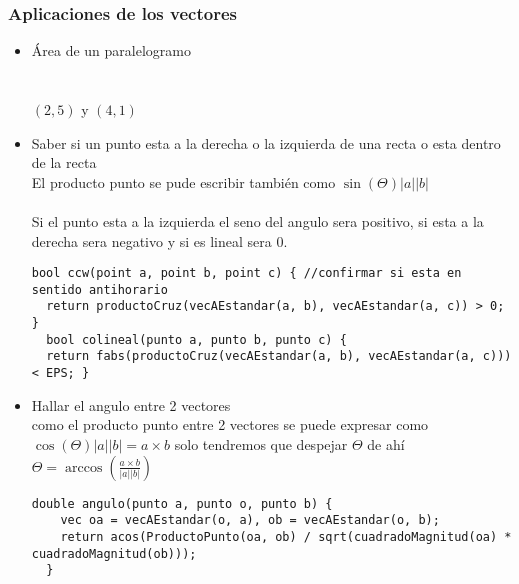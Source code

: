 \subsubsection{Aplicaciones de los vectores}
\begin{itemize}
  \item Área de un paralelogramo
  \\
  \\
  \\
  $\left ( 2,5 \right )$ y $\left (4,1 \right )$
  \item Saber si un punto esta a la derecha o la izquierda  de una recta o esta dentro de la recta
  \\El producto punto se pude escribir también como $\sin \left ( \Theta  \right )\left | a \right |\left | b \right |$
  \\
  \\
  Si el punto esta a la izquierda el seno del angulo sera positivo, si esta a la derecha sera negativo y si es lineal sera 0.
  \begin{lstlisting}[style=C]
  bool ccw(point a, point b, point c) { //confirmar si esta en sentido antihorario
  return productoCruz(vecAEstandar(a, b), vecAEstandar(a, c)) > 0; }
  bool colineal(punto a, punto b, punto c) {
  return fabs(productoCruz(vecAEstandar(a, b), vecAEstandar(a, c))) < EPS; }
  \end{lstlisting}
  \item Hallar el angulo entre 2 vectores
  \\
  como el producto punto entre 2 vectores se puede expresar como
  $\cos \left (\Theta  \right ) \left | a \right | \left | b \right |=a\times b$ solo tendremos que despejar $\Theta$ de ahí
  $\Theta =\arccos \left (\frac{a\times b}{\left | a \right |\left | b \right |}  \right )$
  \begin{lstlisting}[style=C]
  double angulo(punto a, punto o, punto b) {
    vec oa = vecAEstandar(o, a), ob = vecAEstandar(o, b);
    return acos(ProductoPunto(oa, ob) / sqrt(cuadradoMagnitud(oa) * cuadradoMagnitud(ob)));
  }
  \end{lstlisting}
\end{itemize}
